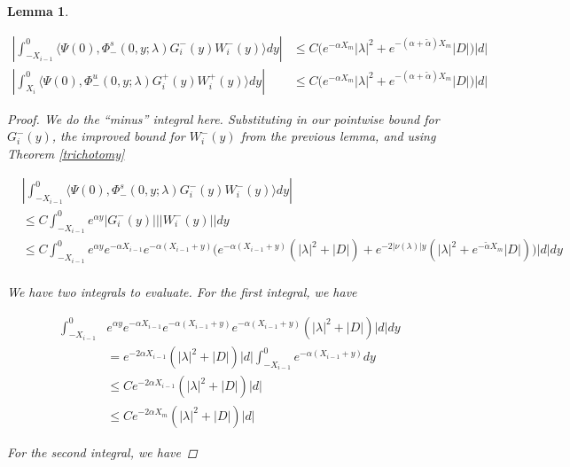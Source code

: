 \documentclass[12pt]{article}
\newtheorem{lemma}{Lemma}
\begin{document}
\begin{lemma}\label{noncenterW}

\begin{align*}
\left| \int_{-X_{i-1}}^0 \langle \Psi(0), \Phi^s_-(0, y; \lambda) G_i^-(y) W_i^-(y) \rangle dy \right| &\leq C \Big( e^{-\alpha X_m} |\lambda|^2 + e^{-(\alpha + \tilde{\alpha}) X_m} |D| \Big) |d| \\
\left| \int_{X_i}^0 \langle \Psi(0), \Phi^u_-(0, y; \lambda) G_i^+(y) W_i^+(y) \rangle dy \right| &\leq C \Big( e^{-\alpha X_m} |\lambda|^2 + e^{-(\alpha + \tilde{\alpha}) X_m} |D| \Big) |d|
\end{align*}

\begin{proof}

We do the ``minus'' integral here. Substituting in our pointwise bound for $G_i^-(y)$, the improved bound for $W_i^-(y)$ from the previous lemma, and using Theorem \ref{trichotomy}

\begin{align*}
&\left| \int_{-X_{i-1}}^0 \langle \Psi(0), \Phi^s_-(0, y; \lambda) G_i^-(y) W_i^-(y) \rangle dy \right| \\
&\leq C \int_{-X_{i-1}}^0 e^{\alpha y} |G_i^-(y)| ||W_i^-(y)|| dy \\
&\leq C \int_{-X_{i-1}}^0 e^{\alpha y} e^{-\alpha X_{i-1}} e^{-\alpha(X_{i-1} + y)} \Big(e^{-\alpha(X_{i-1} + y)}( |\lambda|^2 + |D|)
+ e^{-2|\nu(\lambda)|y}( |\lambda|^2 + e^{-\tilde{\alpha} X_m}|D|) \Big) |d| dy \\
\end{align*}

We have two integrals to evaluate. For the first integral, we have

\begin{align*}
\int_{-X_{i-1}}^0 &e^{\alpha y} e^{-\alpha X_{i-1}} e^{-\alpha(X_{i-1} + y)} e^{-\alpha(X_{i-1} + y)}( |\lambda|^2 + |D|) |d| dy \\
&= e^{-2 \alpha X_{i-1}} ( |\lambda|^2 + |D|) |d| \int_{-X_{i-1}}^0 e^{-\alpha(X_{i-1} + y)} dy \\
&\leq C e^{-2 \alpha X_{i-1}} ( |\lambda|^2 + |D|) |d| \\
&\leq C e^{-2 \alpha X_m}( |\lambda|^2 + |D|) |d|
\end{align*}

For the second integral, we have


\end{proof}
\end{lemma}
\end{document}
